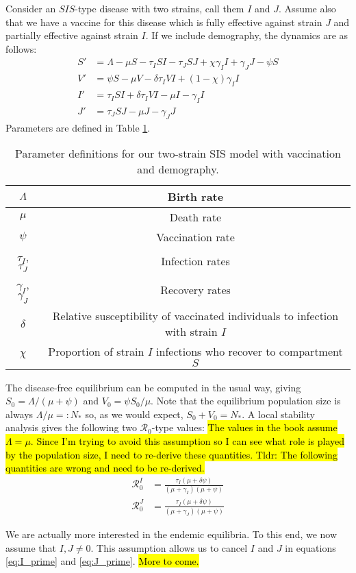 \documentclass[11pt, oneside]{article}   	%
\begin{document}
Consider an $SIS$-type disease with two strains, call them $I$ and $J$. Assume also that we have a vaccine for this disease which is fully effective against strain $J$ and partially effective against strain $I$. If we include demography, the dynamics are as follows:
%
\begin{align}
    S' &= \Lambda - \mu S - \tau_I S I - \tau_J S J + \chi \gamma_I I + \gamma_J J - \psi S \label{eq:S_prime}\\
    V' &= \psi S - \mu V - \delta \tau_I V I + (1 - \chi) \gamma_I I \label{eq:V_prime}\\
    I' &= \tau_I S I + \delta \tau_I V I - \mu I - \gamma_I I \label{eq:I_prime}\\
    J' &= \tau_J S J - \mu J - \gamma_J J \label{eq:J_prime}
\end{align}
%
Parameters are defined in Table \ref{tab:Parameters}.

\begin{table}
\centering
\begin{tabular}{|c|c|}
    \hline
    $\Lambda$ & Birth rate\\
    \hline
    $\mu$ & Death rate\\
    \hline
    $\psi$ & Vaccination rate\\
    \hline
    $\tau_I$, $\tau_J$ & Infection rates\\
    \hline
    $\gamma_I$, $\gamma_J$ & Recovery rates\\
    \hline
    $\delta$ & Relative susceptibility of vaccinated individuals to infection with strain $I$\\
    \hline
    $\chi$ & Proportion of strain $I$ infections who recover to compartment $S$\footnotemark\\
    \hline
\end{tabular}
\caption{Parameter definitions for our two-strain SIS model with vaccination and demography.}
\label{tab:Parameters}
\end{table}


The disease-free equilibrium can be computed in the usual way, giving $S_0 = \Lambda / (\mu + \psi)$ and $V_0 = \psi S_0 / \mu$. Note that the equilibrium population size is always $\Lambda / \mu =: N_*$ so, as we would expect, $S_0 + V_0 = N_*$. A local stability analysis gives the following two $\mathcal{R}_0$-type values: \hl{The values in the book assume $\Lambda = \mu$. Since I'm trying to avoid this assumption so I can see what role is played by the population size, I need to re-derive these quantities. Tldr: The following quantities are wrong and need to be re-derived.}
%
\begin{align*}
    \mathcal{R}_0^I &= \frac{\tau_I (\mu + \delta \psi)}{(\mu + \gamma_I) (\mu + \psi)}\\
    \mathcal{R}_0^J &= \frac{\tau_I (\mu + \delta \psi)}{(\mu + \gamma_J) (\mu + \psi)}    
\end{align*}

We are actually more interested in the endemic equilibria. To this end, we now assume that $I, J \neq 0$. This assumption allows us to cancel $I$ and $J$ in equations \ref{eq:I_prime} and \ref{eq:J_prime}. \hl{More to come.}
\end{document}
